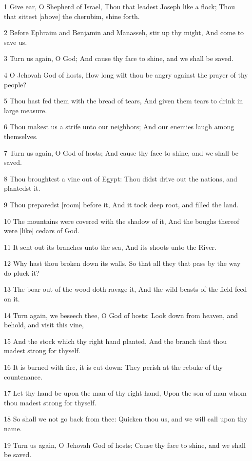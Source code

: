 \par 1 Give ear, O Shepherd of Israel, Thou that leadest Joseph like a flock; Thou that sittest [above] the cherubim, shine forth.
\par 2 Before Ephraim and Benjamin and Manasseh, stir up thy might, And come to save us.
\par 3 Turn us again, O God; And cause thy face to shine, and we shall be saved.
\par 4 O Jehovah God of hosts, How long wilt thou be angry against the prayer of thy people?
\par 5 Thou hast fed them with the bread of tears, And given them tears to drink in large measure.
\par 6 Thou makest us a strife unto our neighbors; And our enemies laugh among themselves.
\par 7 Turn us again, O God of hosts; And cause thy face to shine, and we shall be saved.
\par 8 Thou broughtest a vine out of Egypt: Thou didst drive out the nations, and plantedst it.
\par 9 Thou preparedst [room] before it, And it took deep root, and filled the land.
\par 10 The mountains were covered with the shadow of it, And the boughs thereof were [like] cedars of God.
\par 11 It sent out its branches unto the sea, And its shoots unto the River.
\par 12 Why hast thou broken down its walls, So that all they that pass by the way do pluck it?
\par 13 The boar out of the wood doth ravage it, And the wild beasts of the field feed on it.
\par 14 Turn again, we beseech thee, O God of hosts: Look down from heaven, and behold, and visit this vine,
\par 15 And the stock which thy right hand planted, And the branch that thou madest strong for thyself.
\par 16 It is burned with fire, it is cut down: They perish at the rebuke of thy countenance.
\par 17 Let thy hand be upon the man of thy right hand, Upon the son of man whom thou madest strong for thyself.
\par 18 So shall we not go back from thee: Quicken thou us, and we will call upon thy name.
\par 19 Turn us again, O Jehovah God of hosts; Cause thy face to shine, and we shall be saved.

